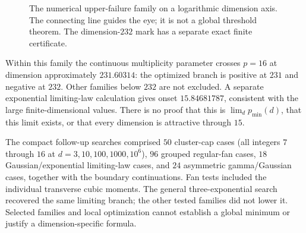 \documentclass[11pt]{article}
\theoremstyle{definition}
\begin{document}
\begin{figure}[htbp]
\centering
{}
\caption{The numerical upper-failure family on a logarithmic dimension
axis. The connecting line guides the eye; it is not a global threshold
theorem. The dimension-$232$ mark has a separate exact finite certificate.}
\label{fig:dimensionprofile}
\end{figure}

Within this family the continuous multiplicity parameter crosses $p=16$
at dimension approximately $231.60314$: the optimized branch is positive
at $231$ and negative at $232$. Other families below $232$ are not excluded.
A separate exponential limiting-law calculation gives onset
$15.84681787$, consistent with the large finite-dimensional values.
There is no proof that this is $\lim_d p_{\min}(d)$, that this limit
exists, or that every dimension is attractive through $15$.

The compact follow-up searches comprised $50$ cluster-cap cases (all
integers $7$ through $16$ at $d=3,10,100,1000,10^6$), $96$ grouped
regular-fan cases, $18$ Gaussian/exponential limiting-law cases, and
$24$ asymmetric gamma/Gaussian cases, together with the boundary
continuations. Fan tests included the individual transverse cubic moments.
The general three-exponential search recovered the same limiting branch;
the other tested families did not lower it. Selected families and local
optimization cannot establish a global minimum or justify a
dimension-specific formula.
\end{document}
